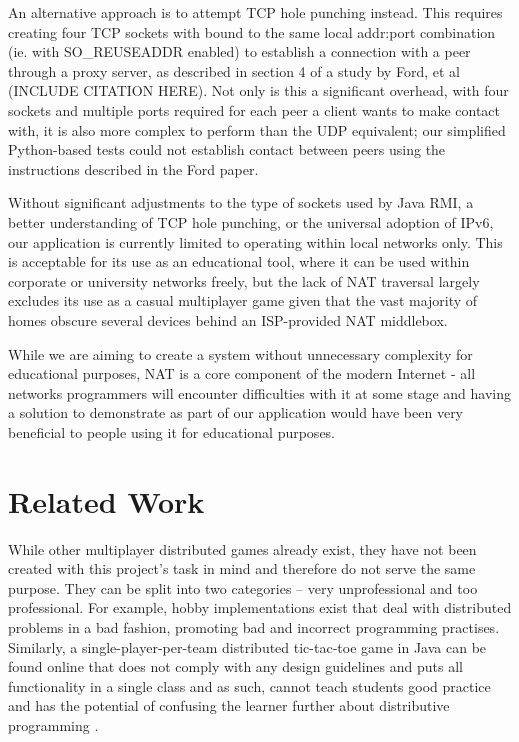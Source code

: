 \documentclass[conference]{IEEEtran}
\begin{document}
An alternative approach is to attempt TCP hole punching instead. This requires creating four TCP sockets with bound to the same local addr:port combination (ie. with SO\_REUSEADDR enabled) to establish a connection with a peer through a proxy server, as described in section 4 of a study by Ford, et al (INCLUDE CITATION HERE). Not only is this a significant overhead, with four sockets and multiple ports required for each peer a client wants to make contact with, it is also more complex to perform than the UDP equivalent; our simplified Python-based tests could not establish contact between peers using the instructions described in the Ford paper.

Without significant adjustments to the type of sockets used by Java RMI, a better understanding of TCP hole punching, or the universal adoption of IPv6, our application is currently limited to operating within local networks only. This is acceptable for its use as an educational tool, where it can be used within corporate or university networks freely, but the lack of NAT traversal largely excludes its use as a casual multiplayer game given that the vast majority of homes obscure several devices behind an ISP-provided NAT middlebox.

While we are aiming to create a system without unnecessary complexity for educational purposes, NAT is a core component of the modern Internet - all networks programmers will encounter difficulties with it at some stage and having a solution to demonstrate as part of our application would have been very beneficial to people using it for educational purposes.



\section{Related Work}
While other multiplayer distributed games already exist, they have not been
created with this project’s task in mind and therefore do not serve the same
purpose. They can be split into two categories – very unprofessional and too
professional. For example, hobby implementations exist that deal with
distributed problems in a bad fashion, promoting bad and incorrect programming 
practises. Similarly, a single-player-per-team distributed tic-tac-toe game in 
Java can be found online that does not comply with any design guidelines and 
puts all functionality in a single class and as such, cannot teach students good 
practice and has the potential of confusing the learner further about distributive 
programming \cite{MrWayFarOutYoutube15}.
\end{document}
